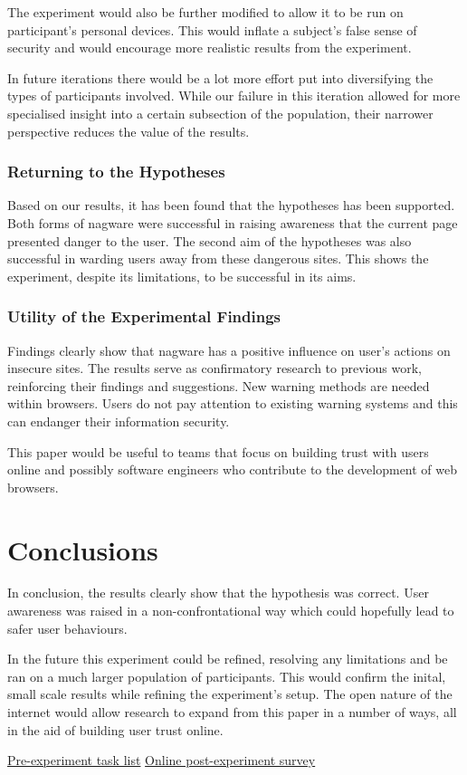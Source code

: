 \documentclass{mpaper}
\begin{document}
The experiment would also be further modified to allow it to be run on participant's personal devices. This would inflate a subject's false sense of security and would encourage more realistic results from the experiment.

In future iterations there would be a lot more effort put into diversifying the types of participants involved. While our failure in this iteration allowed for more specialised insight into a certain subsection of the population, their narrower perspective reduces the value of the results.
 
\subsubsection{Returning to the Hypotheses}
Based on our results, it has been found that the hypotheses has been supported. Both forms of nagware were successful in raising awareness that the current page presented danger to the user. The second aim of the hypotheses was also successful in warding users away from these dangerous sites. This shows the experiment, despite its limitations, to be successful in its aims.

 \subsubsection{Utility of the Experimental Findings}
Findings clearly show that nagware has a positive influence on user's actions on insecure sites. The results serve as confirmatory research to previous work, reinforcing their findings and suggestions.\cite{Sunshine09cryingwolf} New warning methods are needed within browsers. Users do not pay attention to existing warning systems and this can endanger their information security. 

This paper would be useful to teams that focus on building trust with users online and possibly software engineers who contribute to the development of web browsers.

\section{Conclusions}
In conclusion, the results clearly show that the hypothesis was correct. User awareness was raised in a non-confrontational way which could hopefully lead to safer user behaviours.

In the future this experiment could be refined, resolving any limitations and be ran on a much larger population of participants. This would confirm the inital, small scale results while refining the experiment's setup. The open nature of the internet would allow research to expand from this paper in a number of ways, all in the aid of building user trust online.




\appendix

\href{}{Pre-experiment task list}
\href{https://docs.google.com/forms/d/1rxjwT5qNs5T0jX5pM8qvoTl9-ulS-rINJ75bUryIIcI/viewform}{Online post-experiment survey}
\end{document}
